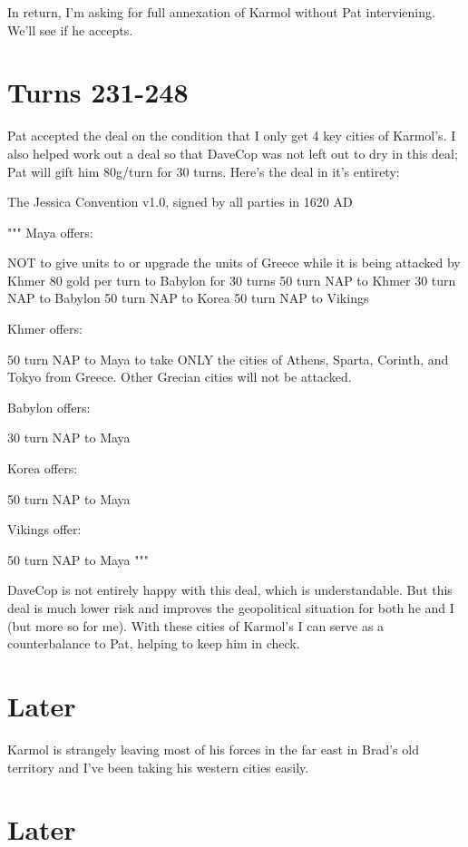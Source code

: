 \documentclass[10pt]{article}
\begin{document}
In return, I'm asking for full annexation of Karmol without Pat interviening. We'll see if he accepts.

\section*{Turns 231-248}

Pat accepted the deal on the condition that I only get 4 key cities of
Karmol's. I also helped work out a deal so that DaveCop was not left
out to dry in this deal; Pat will gift him 80g/turn for 30
turns. Here's the deal in it's entirety:

The Jessica Convention v1.0, signed by all parties in 1620 AD

"""
Maya offers:

    NOT to give units to or upgrade the units of Greece while it is being attacked by Khmer
    80 gold per turn to Babylon for 30 turns
    50 turn NAP to Khmer
    30 turn NAP to Babylon
    50 turn NAP to Korea
    50 turn NAP to Vikings


Khmer offers:

    50 turn NAP to Maya
    to take ONLY the cities of Athens, Sparta, Corinth, and Tokyo from Greece.  Other Grecian cities will not be attacked.


Babylon offers:

    30 turn NAP to Maya


Korea offers:

    50 turn NAP to Maya


Vikings offer:

    50 turn NAP to Maya
"""

DaveCop is not entirely happy with this deal, which is
understandable. But this deal is much lower risk and improves the
geopolitical situation for both he and I (but more so for me). With
these cities of Karmol's I can serve as a counterbalance to Pat,
helping to keep him in check.

\section*{Later}

Karmol is strangely leaving most of his forces in the far east in
Brad's old territory and I've been taking his western cities easily.

\section*{Later}
\end{document}
